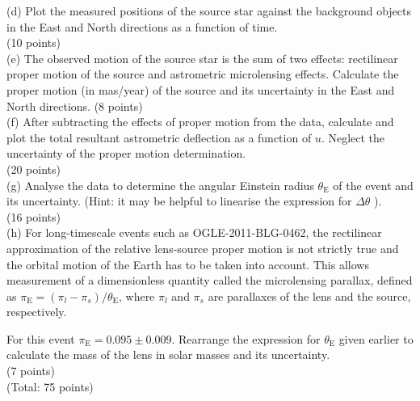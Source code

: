 \documentclass[10pt]{article}
\begin{document}
(d) Plot the measured positions of the source star against the background objects in the East and North directions as a function of time.\\
(10 points)\\
(e) The observed motion of the source star is the sum of two effects: rectilinear proper motion of the source and astrometric microlensing effects. Calculate the proper motion (in mas/year) of the source and its uncertainty in the East and North directions. (8 points)\\
(f) After subtracting the effects of proper motion from the data, calculate and plot the total resultant astrometric deflection as a function of $u$. Neglect the uncertainty of the proper motion determination.\\
(20 points)\\
(g) Analyse the data to determine the angular Einstein radius $\theta_{\mathrm{E}}$ of the event and its uncertainty. (Hint: it may be helpful to linearise the expression for $\Delta \theta$ ).\\
(16 points)\\
(h) For long-timescale events such as OGLE-2011-BLG-0462, the rectilinear approximation of the relative lens-source proper motion is not strictly true and the orbital motion of the Earth has to be taken into account. This allows measurement of a dimensionless quantity called the microlensing parallax, defined as $\pi_{\mathrm{E}}=\left(\pi_{l}-\pi_{s}\right) / \theta_{\mathrm{E}}$, where $\pi_{l}$ and $\pi_{s}$ are parallaxes of the lens and the source, respectively.

For this event $\pi_{\mathrm{E}}=0.095 \pm 0.009$. Rearrange the expression for $\theta_{\mathrm{E}}$ given earlier to calculate the mass of the lens in solar masses and its uncertainty.\\
(7 points)\\
(Total: 75 points)
\end{document}
